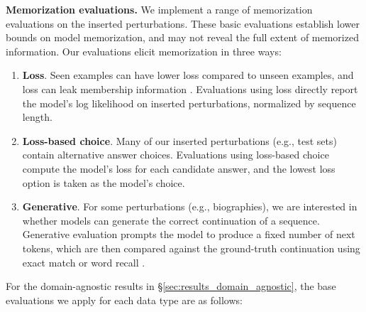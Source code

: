 \documentclass{article} %
\begin{document}
\textbf{Memorization evaluations.} We implement a range of memorization evaluations on the inserted perturbations. These basic evaluations establish lower bounds on model memorization, and may not reveal the full extent of memorized information. Our evaluations elicit memorization in three ways: 
\begin{enumerate}[noitemsep,topsep=0pt]
    \item \textbf{Loss}. Seen examples can have lower loss compared to unseen examples, and loss can leak membership information \citep{shokri2017membershipinferenceattacksmachine}. Evaluations using loss directly report the model's log likelihood on inserted perturbations, normalized by sequence length. 
    \item \textbf{Loss-based choice}. Many of our inserted perturbations (e.g., test sets) contain alternative answer choices. Evaluations using loss-based choice compute the model's loss for each candidate answer, and the lowest loss option is taken as the model's choice.
    \item \textbf{Generative}. For some perturbations (e.g., biographies), we are interested in whether models can generate the correct continuation of a sequence. Generative evaluation prompts the model to produce a fixed number of next tokens, which are then compared against the ground-truth continuation using exact match or word recall \cite[metrics originally used in][]{rajpurkar-etal-2018-know}.
\end{enumerate}
For the domain-agnostic results in \S\ref{sec:results_domain_agnostic}, the base evaluations we apply for each data type are as follows:
\end{document}

